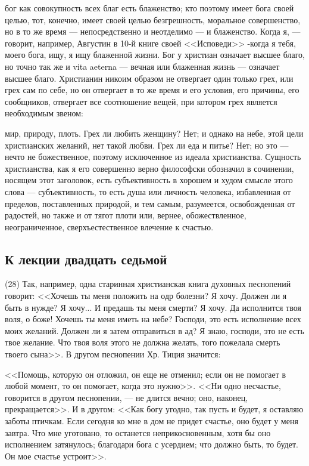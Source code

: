 \documentclass[12pt]{article}
\begin{document}
бог как совокупность всех благ есть блаженство; кто поэтому имеет бога своей целью, тот, конечно, имеет своей целью безгрешность, моральное совершенство, но в то же время --- непосредственно и неотделимо --- и блаженство. Когда я, --- говорит, например, Августин в 10-й книге своей <<Исповеди>>  -когда я тебя, моего бога, ищу, я ищу блаженной жизни. Бог у христиан означает высшее благо, но точно так же и vita aeterna --- вечная или блаженная жизнь --- означает высшее благо. Христианин никоим образом не отвергает один только грех, или грех сам по себе, но он отвергает в то же время и его условия, его причины, его сообщников, отвергает все соотношение вещей, при котором грех является необходимым звеном: 

мир, природу, плоть. Грех ли любить женщину? Нет; и однако на небе, этой цели христианских желаний, нет такой любви. Грех ли еда и питье? Нет; но это --- нечто не божественное, поэтому исключенное из идеала христианства. Сущность христианства, как я его совершенно верно философски обозначил в сочинении, носящем этот заголовок, есть субъективность в хорошем и худом смысле этого слова --- субъективность, то есть душа или личность человека, избавленная от пределов, поставленных природой, и тем самым, разумеется, освобожденная от радостей, но также и от тягот плоти или, вернее, обожествленное, неограниченное, сверхъестественное влечение к счастью. 

\subsection*{К лекции двадцать седьмой}

(28) Так, например, одна старинная христианская книга духовных песнопений говорит: <<Хочешь ты меня положить на одр болезни? Я хочу. Должен ли я быть в нужде? Я хочу... И предашь ты меня смерти? Я хочу. Да исполнится твоя воля, о боже! Хочешь ты меня иметь на небе? Господи, это есть исполнение всех моих желаний. Должен ли я затем отправиться в ад? Я знаю, господи, это не есть твое желание. Что твоя воля этого не должна желать, того пожелала смерть твоего сына>>. В другом песнопении Хр. Тиция значится: 

<<Помощь, которую он отложил, он еще не отменил; если он не помогает в любой момент, то он помогает, когда это нужно>>. <<Ни одно несчастье, говорится в другом песнопении, --- не длится вечно; оно, наконец, прекращается>>. И в другом: <<Как богу угодно, так пусть и будет, я оставляю заботы птичкам. Если сегодня ко мне в дом не придет счастье, оно будет у меня завтра. Что мне уготовано, то останется неприкосновенным, хотя бы оно исполнением затянулось; благодари бога с усердием; что должно быть, то будет. Он мое счастье устроит>>. 
\end{document}
